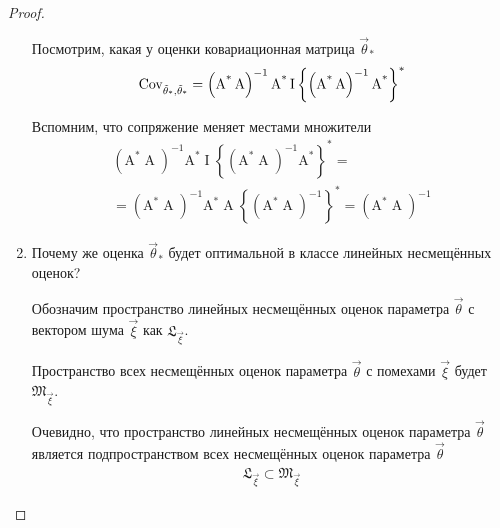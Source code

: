 \begin{proof}
\begin{enumerate}
            Посмотрим, какая у оценки ковариационная матрица $\vec{\theta}_*$
            \begin{align*}
                \operatorname{Cov^{}_{\vec{\theta}_*, \vec{\theta}_*}}
                = \left( \operatorname{A^*} \operatorname{A} \right)^{-1}
                    \operatorname{A^*} \operatorname{I} \left\{
                        \left( \operatorname{A^*} \operatorname{A} \right)^{-1}
                    \operatorname{A^*} \right\}^*
            \end{align*}

            Вспомним, что сопряжение меняет местами множители
            \begin{align*}
                \left( \operatorname{A^*} \operatorname{A} \right)^{-1}
                    \operatorname{A^*} \operatorname{I} \left\{
                        \left( \operatorname{A^*} \operatorname{A} \right)^{-1}
                    \operatorname{A^*} \right\}^* = \\
                = \left( \operatorname{A^*} \operatorname{A} \right)^{-1}
                    \operatorname{A^*} \operatorname{A}
                    \left\{ \left( \operatorname{A^*} \operatorname{A}
                        \right)^{-1} \right\}^*
                = \left( \operatorname{A^*} \operatorname{A} \right)^{-1}
            \end{align*}

        \item Почему же оценка $\vec{\theta}_*$ будет оптимальной в классе
            линейных несмещённых оценок?

            Обозначим пространство линейных несмещённых оценок параметра
            $\vec{\theta}$ с вектором шума $\vec{\xi}$ как
            $\mathfrak{L}_{\vec{\xi}}$.

            Пространство всех несмещённых оценок параметра $\vec{\theta}$ с
            помехами $\vec{\xi}$ будет $\mathfrak{M}_{\vec{\xi}}$.

            Очевидно, что пространство линейных несмещённых оценок параметра
            $\vec{\theta}$ является подпространством всех несмещённых оценок
            параметра $\vec{\theta}$
            \begin{align*}
                \mathfrak{L}_{\vec{\xi}} \subset \mathfrak{M}_{\vec{\xi}}
            \end{align*}


\end{enumerate}
\end{proof}
